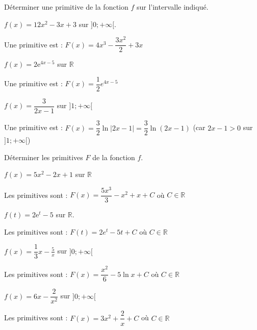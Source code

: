 \documentclass[11pt,a4paper]{article}  %
\begin{document}
\vspace*{-0.5cm}
\exerciceDS{}

Déterminer une primitive de la fonction $f$ sur l'intervalle indiqué.

	\begin{enumMet}
		\item $f(x)=12 x^2-3 x+3$ sur $] 0 ;+\infty[$.
		\begin{corrBox}
			Une primitive est : $F(x) = 4x^3 - \dfrac{3x^2}{2} + 3x$
		\end{corrBox}
		\item $f(x)=2 \mathrm{e}^{4 x-5}$ sur $\mathbb{R}$
		\begin{corrBox}
			Une primitive est : $F(x) = \dfrac{1}{2}e^{4x-5}$
		\end{corrBox}
		\item $f(x)=\dfrac{3}{2 x-1}$ sur $]1; +\infty [$
		\begin{corrBox}
			Une primitive est : $F(x) = \dfrac{3}{2}\ln|2x-1| = \dfrac{3}{2}\ln(2x-1)$ (car $2x-1 > 0$ sur $]1; +\infty[$)
		\end{corrBox}
	\end{enumMet}

\vspace*{-0.5cm}
\exerciceDS{}

Déterminer les primitives $F$ de la fonction $f$.

	\begin{enumMet}
		\item $f(x)=5 x^2-2 x+1$ sur $\mathbb{R}$
		\begin{corrBox}
			Les primitives sont : $F(x) = \dfrac{5x^3}{3} - x^2 + x + C$ où $C \in \mathbb{R}$
		\end{corrBox}
		\item $f(t)=2 \mathrm{e}^t-5$ sur $\mathbb{R}$.
		\begin{corrBox}
			Les primitives sont : $F(t) = 2e^t - 5t + C$ où $C \in \mathbb{R}$
		\end{corrBox}
		\item $f(x)=\dfrac{1}{3} x-\frac{5}{x}$ sur $] 0 ;+\infty[$
		\begin{corrBox}
			Les primitives sont : $F(x) = \dfrac{x^2}{6} - 5\ln x + C$ où $C \in \mathbb{R}$
		\end{corrBox}
		\item $f(x)=6 x-\dfrac{2}{x^2}$ sur $] 0 ;+\infty[$
		\begin{corrBox}
			Les primitives sont : $F(x) = 3x^2 + \dfrac{2}{x} + C$ où $C \in \mathbb{R}$
		\end{corrBox}
	\end{enumMet}
\end{document}
